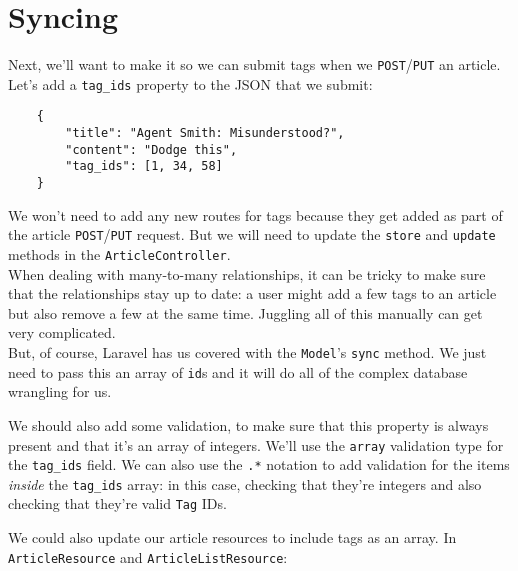 \pagebreak

\section{Syncing}

Next, we'll want to make it so we can submit tags when we \texttt{POST}/\texttt{PUT} an article. Let's add a \texttt{tag\_ids} property to the JSON that we submit:

\begin{verbatim}
    {
        "title": "Agent Smith: Misunderstood?",
        "content": "Dodge this",
        "tag_ids": [1, 34, 58]
    }
\end{verbatim}

We won't need to add any new routes for tags because they get added as part of the article \texttt{POST}/\texttt{PUT} request. But we will need to update the \texttt{store} and \texttt{update} methods in the \texttt{ArticleController}.
\\

When dealing with many-to-many relationships, it can be tricky to make sure that the relationships stay up to date: a user might add a few tags to an article but also remove a few at the same time. Juggling all of this manually can get very complicated.
\\

But, of course, Laravel has us covered with the \texttt{Model}'s \texttt{sync} method. We just need to pass this an array of \texttt{id}s and it will do all of the complex database wrangling for us.


We should also add some validation, to make sure that this property is always present and that it's an array of integers. We'll use the \texttt{array} validation type for the \texttt{tag\_ids} field. We can also use the \texttt{.*} notation to add validation for the items \textit{inside} the \texttt{tag\_ids} array: in this case, checking that they're integers and also checking that they're valid \texttt{Tag} IDs.


We could also update our article resources to include tags as an array. In \texttt{ArticleResource} and \texttt{ArticleListResource}:


